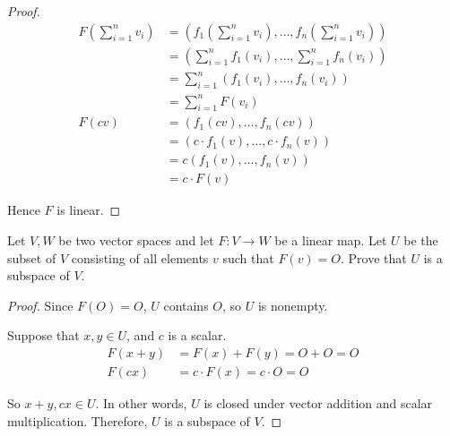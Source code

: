\begin{proof}
    \begin{align*}
        F\left(\sum^{n}_{i=1}v_{i}\right) & = \left(f_{1}\left(\sum^{n}_{i=1}v_{i}\right), \ldots, f_{n}\left(\sum^{n}_{i=1}v_{i}\right)\right) \\
                                          & = \left(\sum^{n}_{i=1}f_{1}(v_{i}), \ldots, \sum^{n}_{i=1}f_{n}(v_{i})\right)                       \\
                                          & = \sum^{n}_{i=1}(f_{1}(v_{i}), \ldots, f_{n}(v_{i}))                                                \\
                                          & = \sum^{n}_{i=1}F(v_{i})                                                                            \\
        F(cv)                             & = (f_{1}(cv), \ldots, f_{n}(cv))                                                                    \\
                                          & = (c\cdot f_{1}(v), \ldots, c\cdot f_{n}(v))                                                        \\
                                          & = c (f_{1}(v), \ldots, f_{n}(v))                                                                    \\
                                          & = c\cdot F(v)
    \end{align*}

    Hence $F$ is linear.
\end{proof}

\begin{exercise}
    Let $V, W$ be two vector spaces and let $F: V \to W$ be a linear map. Let $U$ be the subset of $V$ consisting of all elements $v$ such that $F(v) = O$. Prove that $U$ is a subspace of $V$.
\end{exercise}

\begin{proof}
    Since $F(O) = O$, $U$ contains $O$, so $U$ is nonempty.

    Suppose that $x, y\in U$, and $c$ is a scalar.
    \begin{align*}
        F(x + y) & = F(x) + F(y) = O + O = O    \\
        F(cx)    & = c\cdot F(x) = c\cdot O = O
    \end{align*}

    So $x + y, cx\in U$. In other words, $U$ is closed under vector addition and scalar multiplication. Therefore, $U$ is a subspace of $V$.
\end{proof}

